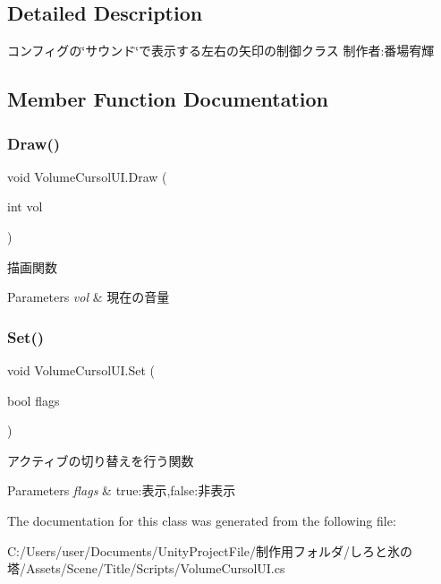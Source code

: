 \subsection{Detailed Description}
コンフィグの\char`\"{}サウンド\char`\"{}で表示する左右の矢印の制御クラス 制作者\+:番場宥輝 



\subsection{Member Function Documentation}
\mbox{\label{class_volume_cursol_u_i_a3e00da6d503c7487983163c1d68eb368}} 
\subsubsection{\texorpdfstring{Draw()}{Draw()}}
{\footnotesize\ttfamily void Volume\+Cursol\+U\+I.\+Draw (\begin{DoxyParamCaption}\item[{int}]{vol }\end{DoxyParamCaption})\hspace{0.3cm}{\ttfamily [inline]}}



描画関数 


\begin{DoxyParams}{Parameters}
{\em vol} & 現在の音量\\
\hline
\end{DoxyParams}
\mbox{\label{class_volume_cursol_u_i_ae0b7838fedc7fb88b8d50eceb7608228}} 
\subsubsection{\texorpdfstring{Set()}{Set()}}
{\footnotesize\ttfamily void Volume\+Cursol\+U\+I.\+Set (\begin{DoxyParamCaption}\item[{bool}]{flags }\end{DoxyParamCaption})\hspace{0.3cm}{\ttfamily [inline]}}



アクティブの切り替えを行う関数 


\begin{DoxyParams}{Parameters}
{\em flags} & true\+:表示,false\+:非表示\\
\hline
\end{DoxyParams}


The documentation for this class was generated from the following file\+:\begin{DoxyCompactItemize}
\item 
C\+:/\+Users/user/\+Documents/\+Unity\+Project\+File/制作用フォルダ/しろと氷の塔/\+Assets/\+Scene/\+Title/\+Scripts/Volume\+Cursol\+U\+I.\+cs\end{DoxyCompactItemize}
